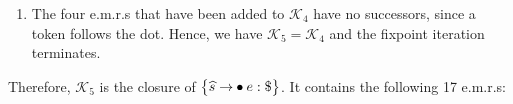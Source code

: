 \begin{enumerate}
\begin{enumerate}[(a)]
      \item The successors of $p \rightarrow \mdot f: \saquoted{*}$ are
            $f \rightarrow \mdot \saquoted{(}\; e \;\saquoted{)}: \saquoted{*}$ and
            $f \rightarrow \mdot \textsl{N}: \saquoted{*}$.
      \item The e.m.r.s $f \rightarrow \mdot \saquoted{(}\; e \;\saquoted{)}: \symbol{36}$ and
            $f \rightarrow \mdot \textsl{N}: \symbol{36}$ have no successors, since a token follows the dot.
      \end{enumerate}
      Therefore, we have
      \\[0.2cm]
      \hspace*{1.3cm}
      $\begin{array}[t]{lcl}
         \mathcal{K}_4 & = & \mathcal{K}_3 \cup \bigl\{ f \rightarrow \mdot \saquoted{(}\; e \;\saquoted{)}: \saquoted{+},\;
                                                        f \rightarrow \mdot \textsl{N}: \saquoted{+}, \\[0.1cm]
                       &   & \hphantom{\mathcal{K}_3 \cup \bigl\{}
                                                        f \rightarrow \mdot \saquoted{(}\; e \;\saquoted{)}: \saquoted{*},\;
                                                        f \rightarrow \mdot \textsl{N}: \saquoted{*} \bigr\}.
       \end{array}$
\item The four e.m.r.s that have been added to $\mathcal{K}_4$ have no successors, since a token follows the dot.
      Hence, we have $\mathcal{K}_5 = \mathcal{K}_4$ and the fixpoint iteration terminates.
\end{enumerate}
Therefore, $\mathcal{K}_5$ is the closure of $\bigl\{\widehat{s} \rightarrow \mdot e: \symbol{36}\bigr\}$.  It
contains the following 17 e.m.r.s:
\\[0.2cm]
\hspace*{1.3cm}
